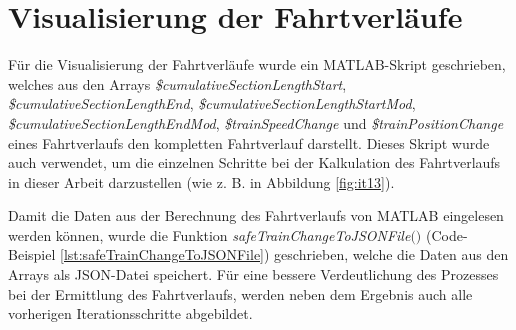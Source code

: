 \section{Visualisierung der Fahrtverläufe} \label{visualisierungFahrtverlaeufe}
Für die Visualisierung der Fahrtverläufe wurde ein MATLAB-Skript geschrieben, welches aus den Arrays \textit{\$cumulativeSectionLengthStart}, \textit{\$cumulativeSectionLengthEnd}, \textit{\$cumulativeSectionLengthStartMod}, \textit{\$cumulativeSectionLengthEndMod}, \textit{\$trainSpeedChange} und \textit{\$trainPositionChange} eines Fahrtverlaufs den kompletten Fahrtverlauf darstellt. Dieses Skript wurde auch verwendet, um die einzelnen Schritte bei der Kalkulation des Fahrtverlaufs in dieser Arbeit darzustellen (wie z. B. in Abbildung \ref{fig:it13}). 

Damit die Daten aus der Berechnung des Fahrtverlaufs von MATLAB eingelesen werden können, wurde die Funktion \textit{safeTrainChangeToJSONFile$($$)$} (Code-Beispiel \ref{lst:safeTrainChangeToJSONFile}) geschrieben, welche die Daten aus den Arrays als JSON-Datei speichert. Für eine bessere Verdeutlichung des Prozesses bei der Ermittlung des Fahrtverlaufs, werden neben dem Ergebnis auch alle vorherigen Iterationsschritte abgebildet.
